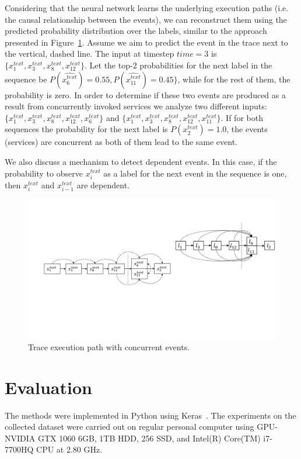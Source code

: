 Considering that the neural network learns the underlying execution paths (i.e. the causal relationship between the events), we can reconstruct them using the predicted probability distribution over the labels, similar to the approach presented in Figure~\ref{workflow}. Assume we aim to predict the event in the trace next to the vertical, dashed line. The input at timestep $time=3$ is $\{x_1^{text}, x_3^{text}, x_8^{text}, x_{12}^{text}\}$. Let the top-2 probabilities for the next label in the sequence be $P(\hat{x_6^{text}})=0.55, P(\hat{x_{11}^{text}})=0.45\}$, while for the rest of them, the probability is zero. In order to determine if these two events are produced as a result from concurrently invoked services we analyze two different inputs: $\{x_1^{text}, x_3^{text}, x_8^{text}, x_{12}^{text}, x_{6}^{text}\}$ and $\{x_1^{text}, x_3^{text}, x_8^{text}, x_{12}^{text}, x_{11}^{text}\}$. If for both sequences the probability for the next label is $P(x_{2}^{text})=1.0$, the events (services) are concurrent as both of them lead to the same event.   

We also discuss a mechanism to detect dependent events. In this case, if the probability to observe $x_{i}^{text}$ as a label for the next event in the sequence is one, then $x_{i}^{text}$ and $x_{i-1}^{text}$ are dependent. 

\begin{figure}[htbp]
\centerline{\includegraphics[width=1.0\textwidth]{gfx/chap6/dependentconcurrent.pdf}}
\caption{Trace execution path with concurrent events.}
\label{workflow}
\end{figure}

\section{Evaluation}\label{evaluation}
The methods were implemented in Python using Keras~\cite{chollet2015keras}. The experiments on the collected dataset were carried out on regular personal computer using GPU-NVIDIA GTX 1060 6GB, 1TB HDD, 256 SSD, and Intel(R) Core(TM) i7-7700HQ CPU at 2.80 GHz.

